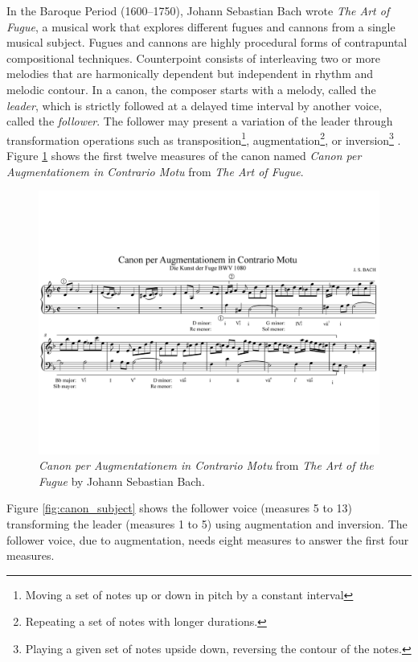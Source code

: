 In the Baroque Period (1600--1750), Johann Sebastian Bach wrote \textit{The Art of Fugue}, a musical
work that explores different fugues and cannons from a single musical subject. Fugues
and cannons are highly procedural forms of contrapuntal compositional techniques.
Counterpoint consists of interleaving two or more melodies that are harmonically
dependent but independent in rhythm and melodic contour. In a canon, the composer starts
with a melody, called the \textit{leader}, which is strictly followed at a delayed time interval
by another voice, called the \textit{follower}. The follower may present a variation of the leader
through transformation operations such as transposition\footnote{Moving a set of notes up or down
in pitch by a constant interval}, augmentation\footnote{Repeating a set of notes with longer durations.}, or inversion\footnote{Playing a given set of notes upside down, reversing the contour of the notes.} \cite{simoni2003algorithmic}. Figure \ref{fig:canon} shows the first twelve measures of the
canon named \textit{Canon per Augmentationem in Contrario Motu} from \textit{The Art of Fugue}.

\begin{figure}[!h]
 \centering
 \includegraphics[width=\columnwidth]{imgs/background/canon_a.pdf}
 \caption{\textit{Canon per Augmentationem in Contrario Motu} from \textit{The Art of the Fugue} by Johann Sebastian Bach.}
 \label{fig:canon}
\end{figure}

Figure \ref{fig:canon_subject} shows the follower voice (measures 5 to 13) transforming the leader
(measures 1 to 5) using augmentation and inversion. The follower voice, due to augmentation, needs eight
measures to answer the first four measures.

